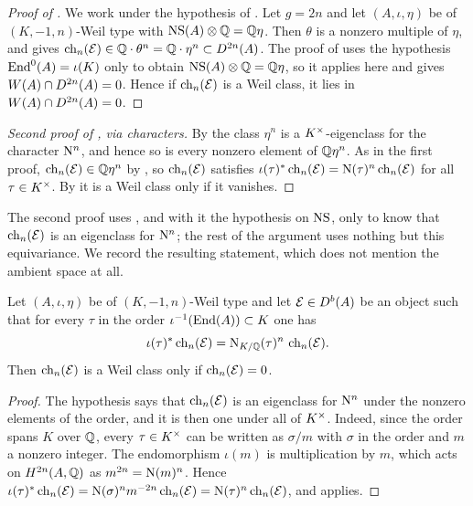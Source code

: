 \begin{proof}[Proof of ]
We work under the hypothesis of . Let $g=2n$ and let
$(A,\iota,\eta)$ be of $(K,-1,n)$-Weil type with
$\mathrm{NS}(A)\otimes\mathbb{Q}=\mathbb{Q}\eta$. Then $\theta$ is a nonzero multiple of $\eta$,
and  gives
$\operatorname{ch}_{n}(\mathcal{E})\in\mathbb{Q}\cdot\theta^{n}=\mathbb{Q}\cdot\eta^{n}\subset D^{2n}(A)$. The
proof of  uses the hypothesis $\operatorname{End}^{0}(A)=\iota(K)$ only
to obtain $\mathrm{NS}(A)\otimes\mathbb{Q}=\mathbb{Q}\eta$, so it applies here and gives
$W(A)\cap D^{2n}(A)=0$. Hence if $\operatorname{ch}_{n}(\mathcal{E})$ is a Weil class, it lies in
$W(A)\cap D^{2n}(A)=0$.
\end{proof}

\begin{proof}[Second proof of , via characters]
By  the class $\eta^{n}$ is a $K^{\times}$-eigenclass for the
character $\mathrm{N}^{n}$, and hence so is every nonzero element of $\mathbb{Q}\eta^{n}$.
As in the first proof, $\operatorname{ch}_{n}(\mathcal{E})\in\mathbb{Q}\eta^{n}$ by
, so $\operatorname{ch}_{n}(\mathcal{E})$ satisfies
$\iota(\tau)^{*}\operatorname{ch}_{n}(\mathcal{E})=\mathrm{N}(\tau)^{n}\operatorname{ch}_{n}(\mathcal{E})$ for all $\tau\in K^{\times}$.
By  it is a Weil class only if it vanishes.
\end{proof}

The second proof uses , and with it the hypothesis on
$\mathrm{NS}$, only to know that $\operatorname{ch}_{n}(\mathcal{E})$ is an eigenclass for $\mathrm{N}^{n}$; the
rest of the argument uses nothing but this equivariance. We record the
resulting statement, which does not mention the ambient space at all.

\begin{theorem}\label{thm:equivsuffices}
Let $(A,\iota,\eta)$ be of $(K,-1,n)$-Weil type and let $\mathcal{E}\in D^{b}(A)$ be
an object such that for every $\tau$ in the order
$\iota^{-1}(\operatorname{End}(A))\subset K$ one has
\[
  \iota(\tau)^{*}\operatorname{ch}_{n}(\mathcal{E})=\mathrm{N}_{K/\mathbb{Q}}(\tau)^{n}\,\operatorname{ch}_{n}(\mathcal{E}).
\]
Then $\operatorname{ch}_{n}(\mathcal{E})$ is a Weil class only if $\operatorname{ch}_{n}(\mathcal{E})=0$.
\end{theorem}

\begin{proof}
The hypothesis says that $\operatorname{ch}_{n}(\mathcal{E})$ is an eigenclass for $\mathrm{N}^{n}$ under
the nonzero elements of the order, and it is then one under all of $K^{\times}$.
Indeed, since the order spans $K$ over $\mathbb{Q}$, every $\tau\in K^{\times}$ can be
written as $\sigma/m$ with $\sigma$ in the order and $m$ a nonzero integer.
The endomorphism $\iota(m)$ is multiplication by $m$, which acts on
$H^{2n}(A,\mathbb{Q})$ as $m^{2n}=\mathrm{N}(m)^{n}$. Hence
$\iota(\tau)^{*}\operatorname{ch}_{n}(\mathcal{E})=\mathrm{N}(\sigma)^{n}m^{-2n}\operatorname{ch}_{n}(\mathcal{E})
=\mathrm{N}(\tau)^{n}\operatorname{ch}_{n}(\mathcal{E})$, and  applies.
\end{proof}

